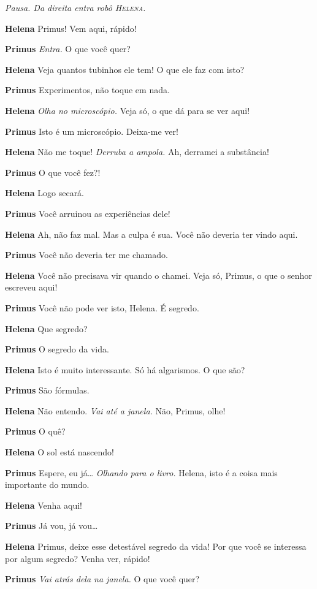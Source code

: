 \emph{Pausa. Da direita entra robô \textsc{Helena}.}

\textbf{Helena} Primus! Vem aqui, rápido!

\textbf{Primus} \emph{Entra.} O que você quer?

\textbf{Helena} Veja quantos tubinhos ele tem! O que ele faz com isto?

\textbf{Primus} Experimentos, não toque em nada.

\textbf{Helena} \emph{Olha no microscópio.} Veja só, o que dá para se ver aqui!

\textbf{Primus} Isto é um microscópio. Deixa-me ver!

\textbf{Helena} Não me toque! \emph{Derruba a ampola.} Ah, derramei a substância!

\textbf{Primus} O que você fez?!

\textbf{Helena} Logo secará.

\textbf{Primus} Você arruinou as experiências dele!

\textbf{Helena} Ah, não faz mal. Mas a culpa é sua. Você não deveria ter vindo aqui.

\textbf{Primus} Você não deveria ter me chamado.

\textbf{Helena} Você não precisava vir quando o chamei. Veja só, Primus, o que o
senhor escreveu aqui!

\textbf{Primus} Você não pode ver isto, Helena. É segredo.

\textbf{Helena} Que segredo?

\textbf{Primus} O segredo da vida.

\textbf{Helena} Isto é muito interessante. Só há algarismos. O que são?

\textbf{Primus} São fórmulas.

\textbf{Helena} Não entendo. \emph{Vai até a janela.} Não, Primus, olhe!

\textbf{Primus} O quê?

\textbf{Helena} O sol está nascendo!

\textbf{Primus} Espere, eu já\ldots{} \emph{Olhando para o livro.} Helena, isto é a coisa mais importante
do mundo.

\textbf{Helena} Venha aqui!

\textbf{Primus} Já vou, já vou\ldots{}

\textbf{Helena} Primus, deixe esse detestável segredo da vida! Por que você se
interessa por algum segredo? Venha ver, rápido!

\textbf{Primus} \emph{Vai atrás dela na janela.} O que você quer?

